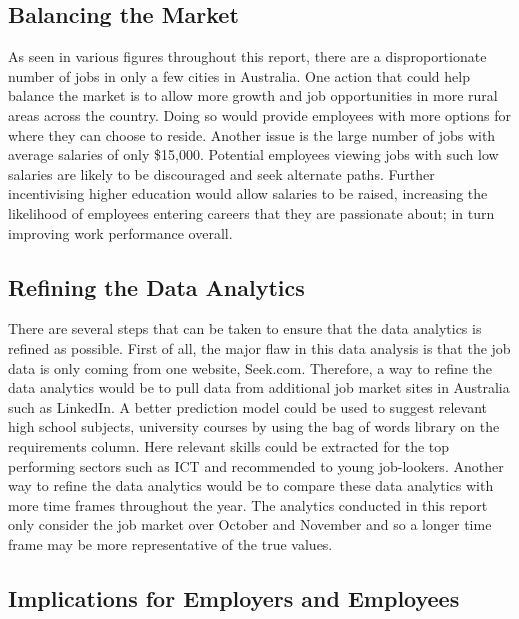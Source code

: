 \documentclass[twoside, 12pt, a4paper]{article}
\begin{document}
\subsection{Balancing the Market}

As seen in various figures throughout this report, there are a disproportionate number of jobs in only a few cities in Australia. One action that could help balance the market is to allow more growth and job opportunities in more rural areas across the country. Doing so would provide employees with more options for where they can choose to reside. Another issue is the large number of jobs with average salaries of only \$15,000. Potential employees viewing jobs with such low salaries are likely to be discouraged and seek alternate paths. Further incentivising higher education would allow salaries to be raised, increasing the likelihood of employees entering careers that they are passionate about; in turn improving work performance overall.

\newpage
\subsection{Refining the Data Analytics}

There are several steps that can be taken to ensure that the data analytics is refined as possible. First of all, the major flaw in this data analysis is that the job data is only coming from one website, Seek.com. Therefore, a way to refine the data analytics would be to pull data from additional job market sites in Australia such as LinkedIn. A better prediction model could be used to suggest relevant high school subjects, university courses by using the bag of words library on the requirements column. Here relevant skills could be extracted for the top performing sectors such as ICT and recommended to young job-lookers. Another way to refine the data analytics would be to compare these data analytics with more time frames throughout the year. The analytics conducted in this report only consider the job market over October and November and so a longer time frame may be more representative of the true values. 

\subsection{Implications for Employers and Employees}
\end{document}
